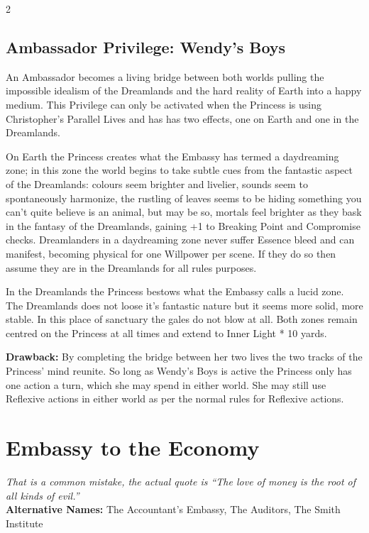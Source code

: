 \begin{multicols}{2}
\subsection*{Ambassador Privilege: Wendy's Boys}

An Ambassador becomes a living bridge between both worlds pulling the impossible idealism of the Dreamlands and the hard reality of Earth into a happy medium. This Privilege can only be activated when the Princess is using Christopher's Parallel Lives and has has two effects, one on Earth and one in the Dreamlands.

On Earth the Princess creates what the Embassy has termed a daydreaming zone; in this zone the world begins to take subtle cues from the fantastic aspect of the Dreamlands: colours seem brighter and livelier, sounds seem to spontaneously harmonize, the rustling of leaves seems to be hiding something you can't quite believe is an animal, but may be so, mortals feel brighter as they bask in the fantasy of the Dreamlands, gaining +1 to Breaking Point and Compromise checks. Dreamlanders in a daydreaming zone never suffer Essence bleed and can manifest, becoming physical for one Willpower per scene. If they do so then assume they are in the Dreamlands for all rules purposes.

In the Dreamlands the Princess bestows what the Embassy calls a lucid zone. The Dreamlands does not loose it's fantastic nature but it seems more solid, more stable. In this place of sanctuary the gales do not blow at all. Both zones remain centred on the Princess at all times and extend to Inner Light * 10 yards.

\textbf{Drawback:} By completing the bridge between her two lives the two tracks of the Princess' mind reunite. So long as Wendy's Boys is active the Princess only has one action a turn, which she may spend in either world. She may still use Reflexive actions in either world as per the normal rules for Reflexive actions.

\section*{Embassy to the Economy}
\label{sec:EmbassyEconomy}

\textit{That is a common mistake, the actual quote is \textquotedblleft The love of money is the root of all kinds of evil.\textquotedblright\, } \\

\noindent \textbf{Alternative Names:} The Accountant's Embassy, The Auditors, The Smith Institute\\


\end{multicols}
